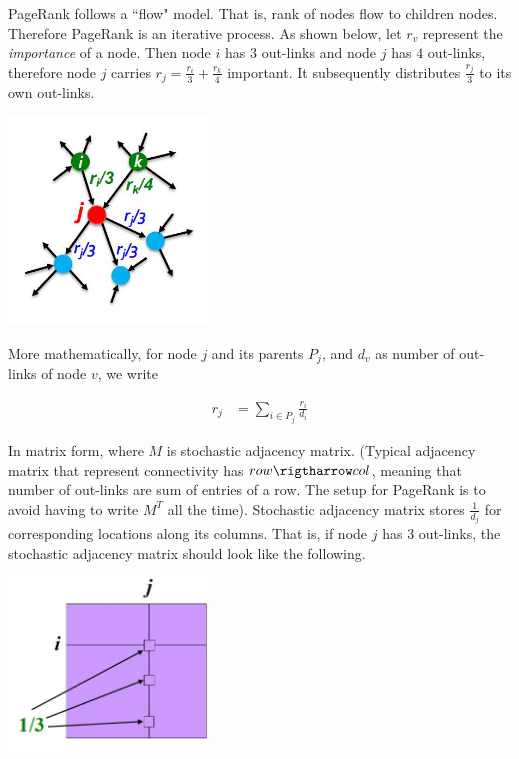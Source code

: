 PageRank follows a ``flow" model. That is, rank of nodes flow to children nodes. Therefore PageRank is an iterative process. As shown below, let $r_v$ represent the \textit{importance} of a node. Then node $i$ has $3$ out-links and node $j$ has $4$ out-links, therefore node $j$ carries $r_j = \frac{r_i}{3} + \frac{r_k}{4}$ important. It subsequently distributes $\frac{r_j}{3}$ to its own out-links.

{
\centering
\includegraphics[width=0.4\textwidth]{notes/img/l11_p23_pagerank.JPG} \par
}

More mathematically, for node $j$ and its parents $P_j$, and $d_v$ as number of out-links of node $v$, we write

\begin{align}
    r_j &= \sum_{i \in P_j} \frac{r_i}{d_i}
\end{align}{}

In matrix form, where $M$ is stochastic adjacency matrix. (Typical adjacency matrix that represent connectivity has $row \rigtharrow col$, meaning that number of out-links are sum of entries of a row. The setup for PageRank is to avoid having to write $M^T$ all the time). Stochastic adjacency matrix stores $\frac{1}{d_j}$ for corresponding locations along its columns. That is, if node $j$ has $3$ out-links, the stochastic adjacency matrix should look like the following. 

{
\centering
\includegraphics[width=0.4\textwidth]{notes/img/l11_p25_matrix.JPG} \par
}


